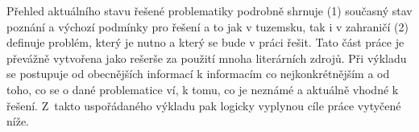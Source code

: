 Přehled aktuálního stavu řešené problematiky podrobně shrnuje (1) současný stav poznání a výchozí podmínky pro řešení a to jak v tuzemsku, tak i v zahraničí (2) definuje problém, který je nutno a který se bude v práci řešit. 
Tato část práce je převážně vytvořena jako rešerše za použití mnoha literárních zdrojů. 
Při výkladu se postupuje od obecnějších informací k informacím co nejkonkrétnějším a od toho, co se o dané problematice ví, k tomu, co je neznámé a aktuálně vhodné k řešení.
Z~takto uspořádaného výkladu pak logicky vyplynou cíle práce vytyčené níže.

